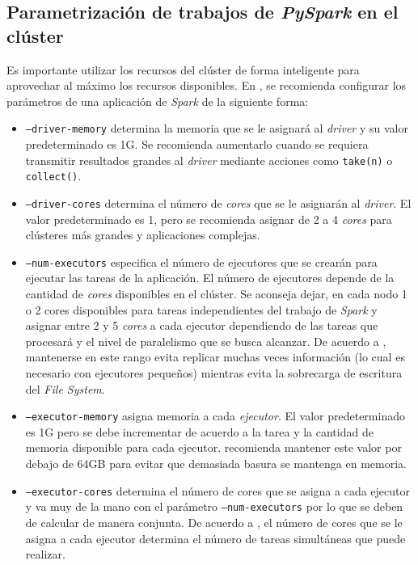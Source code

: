 \subsection{Parametrización de trabajos de \textit{PySpark} en el clúster}

Es importante utilizar los recursos del clúster de forma inteligente para aprovechar al máximo los recursos disponibles. En \cite{sparkconfuds}, se recomienda configurar los parámetros de una aplicación de \textit{Spark} de la siguiente forma:

\begin{itemize}
	\item \texttt{--driver-memory} determina la memoria que se le asignará al \textit{driver} y su valor predeterminado es 1G. Se recomienda aumentarlo cuando se requiera transmitir resultados grandes al \textit{driver} mediante acciones como \texttt{take(n)} o \texttt{collect()}.
	\item \texttt{--driver-cores} determina el número de \textit{cores} que se le asignarán al \textit{driver}. El valor predeterminado es 1, pero se recomienda asignar de 2 a 4 \textit{cores} para clústeres más grandes y aplicaciones complejas. 
	\item \texttt{--num-executors} especifica el número de ejecutores que se crearán para ejecutar las tareas de la aplicación. El número de ejecutores depende de la cantidad de \textit{cores} disponibles en el clúster. Se aconseja dejar, en cada nodo 1 o 2 cores disponibles para tareas independientes del trabajo de \textit{Spark} y asignar entre 2 y 5 \textit{cores} a cada ejecutor dependiendo de las tareas que procesará y el nivel de paralelismo que se busca alcanzar. De acuerdo a \cite{sparkconfcloudera}, mantenerse en este rango evita replicar muchas veces información (lo cual es necesario con ejecutores pequeños) mientras evita la sobrecarga de escritura del \textit{File System}.
	\item \texttt{--executor-memory} asigna memoria a cada \textit{ejecutor}. El valor predeterminado es 1G pero se debe incrementar de acuerdo a la tarea y la cantidad de memoria disponible para cada ejecutor. \cite{sparkconfcloudera} recomienda mantener este valor por debajo de 64GB para evitar que demasiada basura se mantenga en memoria.
	\item \texttt{--executor-cores} determina el número de cores que se asigna a cada ejecutor y va muy de la mano con el parámetro \texttt{--num-executors} por lo que se deben de calcular de manera conjunta. De acuerdo a \cite{sparkconfcloudera}, el número de cores que se le asigna a cada ejecutor determina el número de tareas simultáneas que puede realizar.
\end{itemize}

